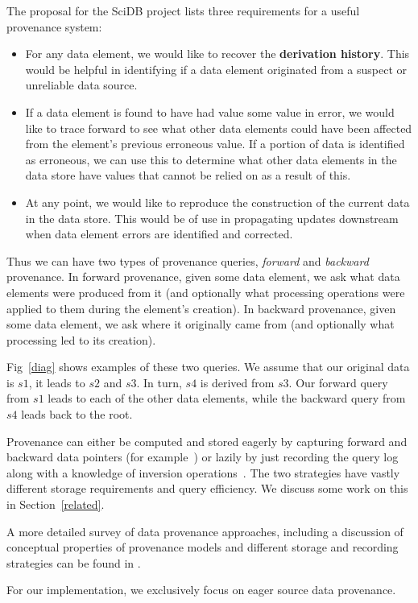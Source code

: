 The proposal for the SciDB project\cite{stonebraker9requirements} lists three requirements for a useful provenance system:

\begin{itemize}
\item For any data element, we would like to recover the \textbf{derivation history}. This would be helpful in identifying if a data element originated from a suspect or unreliable data source.
\item If a data element is found to have had value some value in error, we would like to trace forward to see what other data elements could have been affected from the element's previous erroneous value. If a portion of data is identified as erroneous, we can use this to determine what other data elements in the data store have values that cannot be relied on as a result of this.
\item At any point, we would like to reproduce the construction of the current data in the data store. This would be of use in propagating updates downstream when data element errors are identified and corrected.
\end{itemize}

Thus we can have two types of provenance queries, \textit{forward} and \textit{backward} provenance. In forward provenance, given some data element, we ask what data elements were produced from it (and optionally what processing operations were applied to them during the element's creation). In backward provenance, given some data element, we ask where it originally came from (and optionally what processing led to its creation). 

Fig~\ref{diag} shows examples of these two queries. We assume that our original data is $s1$, it leads to $s2$ and $s3$. In turn, $s4$ is derived from $ s3$. Our forward query from $ s1$ leads to each of the other data elements, while the backward query from  $s4$ leads back to the root. 

Provenance can either be computed and stored eagerly by capturing forward and backward data pointers (for example~\cite{widom2005trio}) or lazily by just recording the query log along with a knowledge of inversion operations~\cite{stonebraker9requirements}. The two strategies have vastly different storage requirements and query efficiency. We discuss some work on this in Section~\ref{related}.

A more detailed survey of data provenance approaches, including a discussion of conceptual properties of provenance models and different storage and recording strategies can be found in \cite{glavic_dataprovenance, simmhan_survey}. 

For our implementation, we exclusively focus on eager source data provenance. 